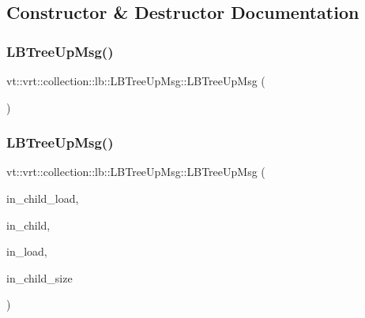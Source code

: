 \subsection{Constructor \& Destructor Documentation}
\mbox{\label{structvt_1_1vrt_1_1collection_1_1lb_1_1_l_b_tree_up_msg_a3dd039d297e1ea09939a13ad5a3722a3}} 
\subsubsection{\texorpdfstring{L\+B\+Tree\+Up\+Msg()}{LBTreeUpMsg()}\hspace{0.1cm}{\footnotesize\ttfamily [1/2]}}
{\footnotesize\ttfamily vt\+::vrt\+::collection\+::lb\+::\+L\+B\+Tree\+Up\+Msg\+::\+L\+B\+Tree\+Up\+Msg (\begin{DoxyParamCaption}{ }\end{DoxyParamCaption})\hspace{0.3cm}{\ttfamily [default]}}

\mbox{\label{structvt_1_1vrt_1_1collection_1_1lb_1_1_l_b_tree_up_msg_ac2ff0f6b4a047ab11a0cd372c54a141e}} 
\subsubsection{\texorpdfstring{L\+B\+Tree\+Up\+Msg()}{LBTreeUpMsg()}\hspace{0.1cm}{\footnotesize\ttfamily [2/2]}}
{\footnotesize\ttfamily vt\+::vrt\+::collection\+::lb\+::\+L\+B\+Tree\+Up\+Msg\+::\+L\+B\+Tree\+Up\+Msg (\begin{DoxyParamCaption}\item[{\hyperlink{namespacevt_a8fb51741340b87d7aaee0bef60e9896b}{Load\+Type} const}]{in\+\_\+child\+\_\+load,  }\item[{\hyperlink{namespacevt_a866da9d0efc19c0a1ce79e9e492f47e2}{Node\+Type} const}]{in\+\_\+child,  }\item[{\hyperlink{structvt_1_1vrt_1_1collection_1_1lb_1_1_hier_l_b_types_a597a60d517207b90e8c7984eac434e8f}{Obj\+Sample\+Type}}]{in\+\_\+load,  }\item[{\hyperlink{namespacevt_a866da9d0efc19c0a1ce79e9e492f47e2}{Node\+Type} const}]{in\+\_\+child\+\_\+size }\end{DoxyParamCaption})\hspace{0.3cm}{\ttfamily [inline]}}



